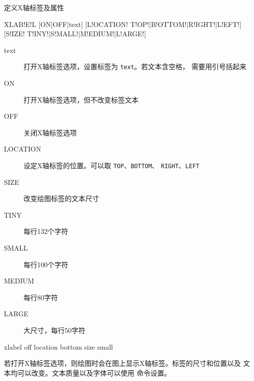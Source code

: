 \label{cmd:xlabel}

定义X轴标签及属性

\begin{SACSTX}
XLAB!E!L [ON|OFF|text] [L!OCATION! T!OP!|B!OTTOM!|R!IGHT!|L!EFT!]
    [S!IZE! T!INY!|S!MALL!|M!EDIUM!|L!ARGE!]
\end{SACSTX}

\begin{description}
\item [text] 打开X轴标签选项，设置标签为 \texttt{text}。若文本含空格，
    需要用引号括起来
\item [ON] 打开X轴标签选项，但不改变标签文本
\item [OFF] 关闭X轴标签选项
\item [LOCATION] 设定X轴标签的位置。可以取 \texttt{TOP}、\texttt{BOTTOM}、
    \texttt{RIGHT}、\texttt{LEFT}
\item [SIZE] 改变绘图标签的文本尺寸
\item [TINY] 每行132个字符
\item [SMALL] 每行100个字符
\item [MEDIUM] 每行80字符
\item [LARGE] 大尺寸，每行50字符
\end{description}

\begin{SACDFT}
xlabel off location bottom size small
\end{SACDFT}

若打开X轴标签选项，则绘图时会在图上显示X轴标签。标签的尺寸和位置以及
文本均可以改变。文本质量以及字体可以使用  命令设置。
